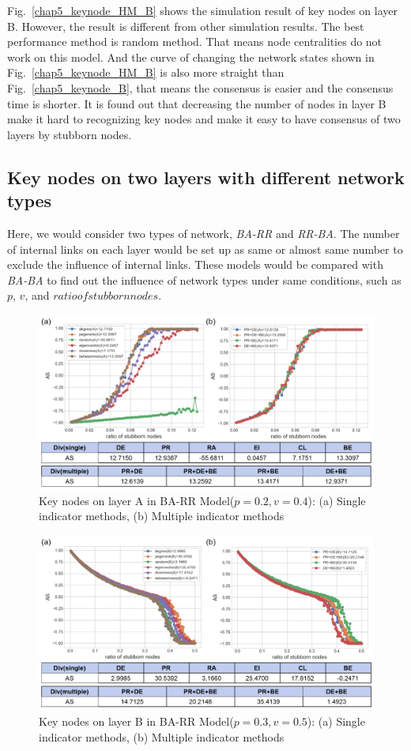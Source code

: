Fig.~\ref{chap5_keynode_HM_B} shows the simulation result of key nodes on layer B. However, the result is different from other simulation results. The best performance method is random method. That means node centralities do not work on this model. And the curve of changing the network states shown in Fig.~\ref{chap5_keynode_HM_B} is also more straight than Fig.~\ref{chap5_keynode_B}, that means the consensus is easier and the consensus time is shorter. It is found out that decreasing the number of nodes in layer B make it hard to recognizing key nodes and make it easy to have consensus of two layers by stubborn nodes. 

\subsection{Key nodes on two layers with different network types}
Here, we would consider two types of network, \textit{BA-RR} and \textit{RR-BA}. The number of internal links on each layer would be set up as same or almost same number to exclude the influence of internal links. These models would be compared with \textit{BA-BA} to find out the influence of network types under same conditions, such as $p$, $v$, and $ratio of stubborn nodes$.  
\begin{figure}[!htb]
	\centering
	\includegraphics[width=\hsize]{figure/chap5_keynode_BA_RR_A.png}
	\caption{Key nodes on layer A in BA-RR Model($p=0.2, v=0.4$):
		(a) Single indicator methods, (b) Multiple indicator methods}
	\label{chap5_keynode_BA_RR_A}
\end{figure}
\begin{figure}[!htb]
	\centering
	\includegraphics[width=\hsize]{figure/chap5_keynode_BA_RR_B.png}
	\caption{Key nodes on layer B in BA-RR Model($p=0.3, v=0.5$):
		(a) Single indicator methods, (b) Multiple indicator methods}
	\label{chap5_keynode_BA_RR_B}
\end{figure}
